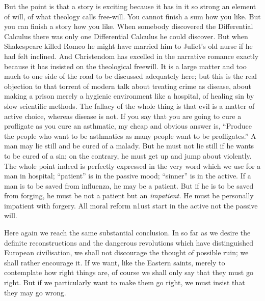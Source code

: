 \documentclass{book}
\begin{document}
But the point is that a story is exciting because it has in it so strong an element of will, of what theology calls free-will. You cannot finish a sum how you like. But you can finish a story how you like. When somebody discovered the Differential Calculus there was only one Differential Calculus he could discover. But when Shakespeare killed Romeo he might have married him to Juliet’s old nurse if he had felt inclined. And Christendom has excelled in the narrative romance exactly because it has insisted on the theological freewill. It is a large matter and too much to one side of the road to be discussed adequately here; but this is the real objection to that torrent of modern talk about treating crime as disease, about making a prison merely a hygienic environment like a hospital, of healing sin by slow scientific methods. The fallacy of the whole thing is that evil is a matter of active choice, whereas disease is not. If you say that you are going to cure a profligate as you cure an asthmatic, my cheap and obvious answer is, “Produce the people who want to be asthmatics as many people want to be profligates.” A man may lie still and be cured of a malady. But he must not lie still if he wants to be cured of a sin; on the contrary, he must get up and jump about violently. The whole point indeed is perfectly expressed in the very word which we use for a man in hospital; “patient” is in the passive mood; “sinner” is in the active. If a man is to be saved from influenza, he may be a patient. But if he is to be saved from forging, he must be not a patient but an \emph{impatient.} He must be personally impatient with forgery. All moral reform n1ust start in the active not the passive will.

Here again we reach the same substantial conclusion. In so far as we desire the definite reconstructions and the dangerous revolutions which have distinguished European civilisation, we shall not discourage the thought of possible ruin; we shall rather encourage it. If we want, like the Eastern saints, merely to contemplate how right things are, of course we shall only say that they must go right. But if we particularly want to make them go right, we must insist that they may go wrong.
\end{document}
